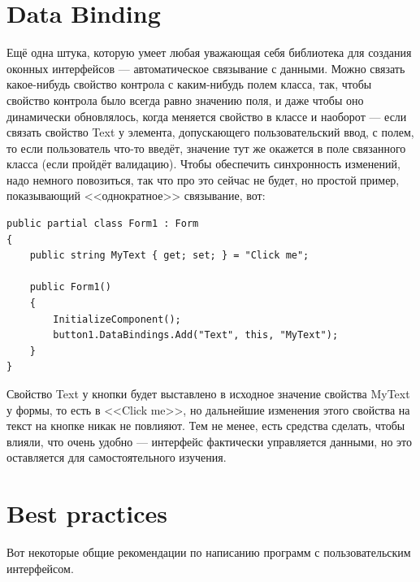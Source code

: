 \documentclass{../../text-style}
\begin{document}
\section{Data Binding}

Ещё одна штука, которую умеет любая уважающая себя библиотека для создания оконных интерфейсов --- автоматическое связывание с данными. Можно связать какое-нибудь свойство контрола с каким-нибудь полем класса, так, чтобы свойство контрола было всегда равно значению поля, и даже чтобы оно динамически обновлялось, когда меняется свойство в классе и наоборот --- если связать свойство Text у элемента, допускающего пользовательский ввод, с полем, то если пользователь что-то введёт, значение тут же окажется в поле связанного класса (если пройдёт валидацию). Чтобы обеспечить синхронность изменений, надо немного повозиться, так что про это сейчас не будет, но простой пример, показывающий <<однократное>> связывание, вот:

\begin{verbatim}
public partial class Form1 : Form
{
    public string MyText { get; set; } = "Click me";

    public Form1()
    {
        InitializeComponent();
        button1.DataBindings.Add("Text", this, "MyText");
    }
}
\end{verbatim}

Свойство Text у кнопки будет выставлено в исходное значение свойства MyText у формы, то есть в <<Click me>>, но дальнейшие изменения этого свойства на текст на кнопке никак не повлияют. Тем не менее, есть средства сделать, чтобы влияли, что очень удобно --- интерфейс фактически управляется данными, но это оставляется для самостоятельного изучения.

\section{Best practices}

Вот некоторые общие рекомендации по написанию программ с пользовательским интерфейсом.
\end{document}
